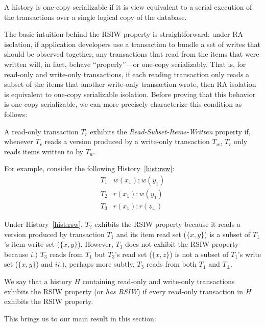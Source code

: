 \begin{definition}
  A history is one-copy serializable if it is view equivalent to a serial
  execution of the transactions over a single logical copy of the
  database.
\end{definition}

The basic intuition behind the RSIW property is straightforward: under
RA isolation, if application developers use a transaction to bundle a
set of writes that should be observed together, any transactions that
read from the items that were written will, in fact, behave ``properly''---or
one-copy serializably. That is, for read-only and write-only transactions, if
each reading transaction only reads a subset of the items that another
write-only transaction wrote, then RA isolation is equivalent to
one-copy serializable isolation. Before proving that this behavior is
one-copy serializable, we can more precisely characterize this condition as
follows:

\begin{definition} A read-only transaction
  $T_r$ exhibits the \textit{Read-Subset-Items-Written} property if,
  whenever $T_r$ reads a version produced by a write-only transaction
  $T_w$, $T_r$ only reads items written to by $T_w$.
\end{definition}

For example, consider the following History~\ref{hist:rsw}:
\begin{eqnarray}
\label{hist:rsw}
T_1 & w(x_1); w(y_1)\\
T_2 & r(x_1); w(y_1)\nonumber\\
T_3 & r(x_1); r(z_\bot)\nonumber
\end{eqnarray}

Under History~\ref{hist:rsw}, $T_2$ exhibits the RSIW property because
it reads a version produced by transaction $T_1$ and its item read set
($\{x,y\}$) is a subset of $T_1$'s item write set ($\{x,y\}$). However,
$T_3$ does not exhibit the RSIW property because $i.)$ $T_3$ reads from
$T_1$ but $T_3$'s read set ($\{x,z\}$) is not a subset of $T_1$'s
write set ($\{x,y\}$) and $ii.)$, perhaps more subtly, $T_3$ reads
from both $T_1$ and $T_\bot$.

We say that a history $H$ containing read-only and write-only
transactions exhibits the RSIW property (or \textit{has RSIW}) if every read-only transaction
in $H$ exhibits the RSIW property.

This brings us to our main result in this section:

